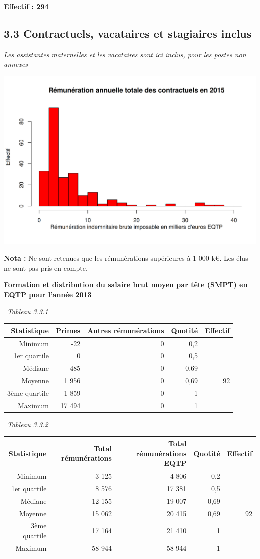 \textbf{Effectif : 294 }

\hypertarget{contractuels-vacataires-et-stagiaires-inclus-1}{%
\subsection{3.3 Contractuels, vacataires et stagiaires
inclus}\label{contractuels-vacataires-et-stagiaires-inclus-1}}

\emph{Les assistantes maternelles et les vacataires sont ici inclus,
pour les postes non annexes}

\includegraphics{altair_files/figure-latex/unnamed-chunk-94-1.png}

\textbf{Nota :} Ne sont retenues que les rémunérations supérieures à 1
000 k€. Les élus ne sont pas pris en compte.

\textbf{Formation et distribution du salaire brut moyen par tête (SMPT)
en EQTP pour l'année 2013 }

~\emph{Tableau 3.3.1}

\begin{longtable}[]{@{}rrrrr@{}}
\toprule
Statistique & Primes & Autres rémunérations & Quotité &
Effectif\tabularnewline
\midrule
\endhead
Minimum & -22 & 0 & 0,2 &\tabularnewline
1er quartile & 0 & 0 & 0,5 &\tabularnewline
Médiane & 485 & 0 & 0,69 &\tabularnewline
Moyenne & 1 956 & 0 & 0,69 & 92\tabularnewline
3ème quartile & 1 859 & 0 & 1 &\tabularnewline
Maximum & 17 494 & 0 & 1 &\tabularnewline
\bottomrule
\end{longtable}

~\emph{Tableau 3.3.2}

\begin{longtable}[]{@{}rrrrr@{}}
\toprule
Statistique & Total rémunérations & Total rémunérations EQTP & Quotité &
Effectif\tabularnewline
\midrule
\endhead
Minimum & 3 125 & 4 806 & 0,2 &\tabularnewline
1er quartile & 8 576 & 17 381 & 0,5 &\tabularnewline
Médiane & 12 155 & 19 007 & 0,69 &\tabularnewline
Moyenne & 15 062 & 20 415 & 0,69 & 92\tabularnewline
3ème quartile & 17 164 & 21 410 & 1 &\tabularnewline
Maximum & 58 944 & 58 944 & 1 &\tabularnewline
\bottomrule
\end{longtable}

